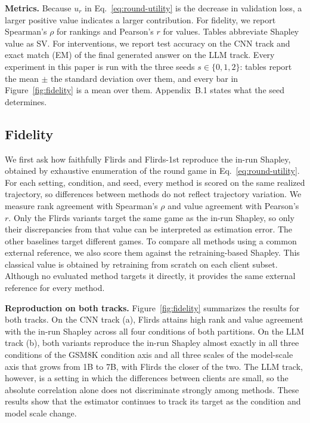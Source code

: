 \documentclass[letterpaper]{article} %
\theoremstyle{definition} %
\newcommand{\yhha}[1]
{{\leavevmode\color{SkyBlue}[yhha:#1]}}
\begin{document}
\noindent\textbf{Metrics.} Because $u_r$ in Eq.~\eqref{eq:round-utility} is the decrease
in validation loss, a larger positive value indicates a larger contribution.
For fidelity, we report Spearman's $\rho$ for rankings and Pearson's $r$ for
values. Tables abbreviate Shapley value as SV. For
interventions, we report test accuracy on the CNN track and exact match (EM)
of the final generated answer on the LLM track. Every experiment in this paper
is run with the three seeds $s \in \{0, 1, 2\}$: tables report the mean $\pm$
the standard deviation over them, and every bar in
Figure~\ref{fig:fidelity} is a mean over them. Appendix~B.1 states what the
seed determines.




\subsection{Fidelity}
\label{sec:fidelity}

We first ask how faithfully Flirds and Flirds-1st reproduce the in-run
Shapley, obtained by exhaustive enumeration of the round game in
Eq.~\eqref{eq:round-utility}. For each setting, condition, and seed, every
method is scored on the same realized trajectory, so differences between
methods do not reflect trajectory variation. We measure
rank agreement with Spearman's $\rho$ and value agreement with Pearson's
$r$. %
Only the Flirds variants target the same game as the in-run Shapley, so only
their discrepancies from that value can be interpreted as estimation error.
The other baselines target different games. To compare all methods using a
common external reference, we also score them against the retraining-based
Shapley. This classical value is obtained by retraining from scratch on each
client subset. Although no evaluated method targets it directly, it provides
the same external reference for every method.



\noindent\textbf{Reproduction on both tracks.} Figure~\ref{fig:fidelity} summarizes the
results for both tracks.
On the CNN track (a), Flirds attains high rank and
value agreement with the in-run Shapley across all four conditions of both
partitions. On the LLM track (b), both variants reproduce the in-run Shapley
almost exactly in all three conditions of the GSM8K condition axis and all three scales of the
model-scale axis that grows from 1B to 7B, with Flirds the closer of the two.
The LLM track, however, is a
setting in which the differences between clients are small, so the absolute
correlation alone does not discriminate strongly among methods. These results
show that the estimator continues to track its target as the condition and model scale change.
\end{document}
